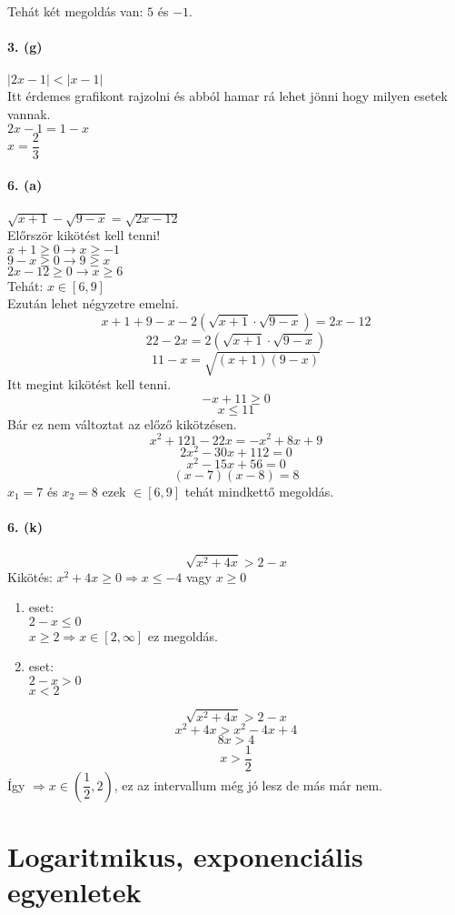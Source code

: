 \documentclass[12pt,a4paper,fleqn]{article}
\begin{document}
Tehát két megoldás van: $5$ és $-1$.\\\\
\textbf{3. (g)} \\\\
$|2x-1| < |x-1|$  \\
Itt érdemes grafikont rajzolni és abból hamar rá lehet jönni
hogy milyen esetek vannak. \\
$2x-1 = 1-x$ \\
$x = \dfrac{2}{3}$ \\\\
\textbf{6. (a)} \\\\
$\sqrt{x+1} - \sqrt{9-x} = \sqrt{2x-12}$ \\
Előrször kikötést kell tenni! \\
$x+1 \geq 0 \rightarrow x \geq -1$ \\
$9-x \geq 0 \rightarrow 9 \geq x$ \\
$2x-12 \geq 0 \rightarrow x \geq 6$ \\
Tehát: $x \in [6, 9]$ \\
Ezután lehet négyzetre emelni.
$$ x+1+9-x-2(\sqrt{x+1} \cdot \sqrt{9-x}) = 2x-12 $$
$$ 22-2x = 2(\sqrt{x+1} \cdot \sqrt{9-x}) $$
$$ 11-x = \sqrt{(x+1)(9-x)} $$
Itt megint kikötést kell tenni.
$$ -x + 11 \geq 0 $$
$$ x \leq 11 $$
Bár ez nem változtat az előző kikötzésen.
$$ x^2 + 121 - 22x = -x^2 + 8x + 9 $$
$$ 2x^2 -30x +112 = 0 $$
$$ x^2 -15x +56 = 0 $$
$$ (x-7)(x-8) = 8 $$
$ x_1 = 7 $ és $ x_2=8 $ ezek $\in [6,9]$ tehát mindkettő megoldás. \\\\
\textbf{6. (k)} \\\\
$$\sqrt{x^2+4x} > 2-x$$
Kikötés: $ x^2 +4x \geq 0 \Rightarrow x \leq -4$ vagy $x \geq 0$
\begin{enumerate}
  \item eset: \\
  $2-x \leq 0$ \\
  $x \geq 2 \Rightarrow x \in [2, \infty]$ ez megoldás.
  \item eset: \\
  $ 2-x > 0 $ \\
  $ x < 2 $
\end{enumerate}
$$ \sqrt{x^2+4x} > 2-x $$
$$ x^2 + 4x > x^2 - 4x +4 $$
$$ 8x > 4 $$
$$ x > \dfrac{1}{2} $$
Így $ \Rightarrow x \in \left(\dfrac{1}{2}, 2\right)$, ez az intervallum még jó lesz de más már nem.

\section{Logaritmikus, exponenciális egyenletek}
\setcounter{subsection}{1}
\end{document}
